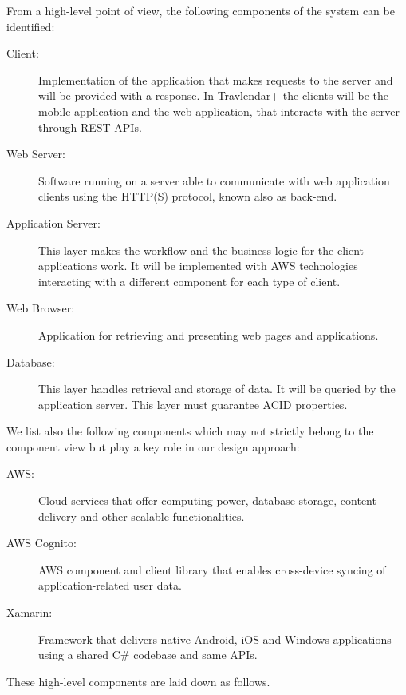 From a high-level point of view, the following components of the system can be identified:
\begin{description}
\item[Client:] Implementation of the application that makes requests to the server and will be provided with a response. In Travlendar+ the clients will be the mobile application and the web application, that interacts with the server through REST APIs.
\item[Web Server:] Software running on a server able to communicate with web application clients using the HTTP(S) protocol, known also as back-end.

\item[Application Server:] This layer makes the workflow and the business logic for the client applications work. It will be implemented with AWS technologies interacting with a different component for each type of client.
\item[Web Browser:] Application for retrieving and presenting web pages and applications.
\item[Database:] This layer handles retrieval and storage of data. It will be queried by the application server. This layer must guarantee ACID properties.
\end{description}

We list also the following components which may not strictly belong to the component view but play a key role in our design approach:
\begin{description}
\item[AWS:] Cloud services that offer computing power, database storage, content delivery and other scalable functionalities.
\item [AWS Cognito:] AWS component and client library that enables cross-device syncing of application-related user data.
\item[Xamarin:] Framework that delivers native Android, iOS and Windows applications using a shared C\# codebase and same APIs.
\end{description}

These high-level components are laid down as follows.

